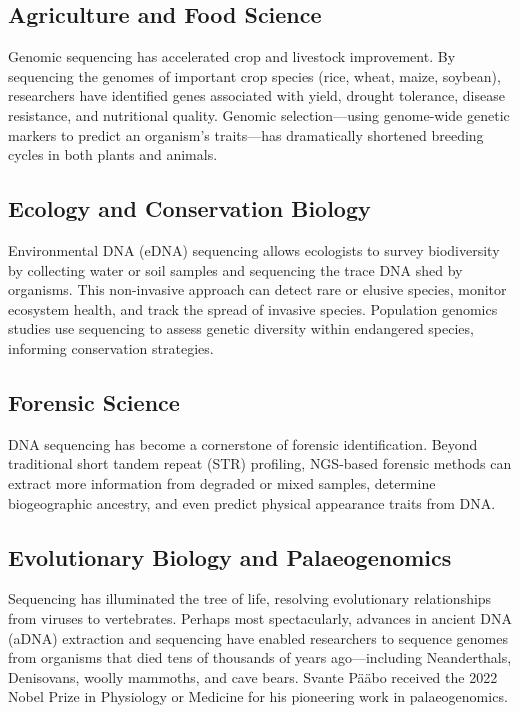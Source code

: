 \subsection{Agriculture and Food Science}
\label{subsec:intro:agriculture}

Genomic sequencing has accelerated crop and livestock improvement. By sequencing the genomes of important crop species (rice, wheat, maize, soybean), researchers have identified genes associated with yield, drought tolerance, disease resistance, and nutritional quality. Genomic selection---using genome-wide genetic markers to predict an organism's traits---has dramatically shortened breeding cycles in both plants and animals.

\subsection{Ecology and Conservation Biology}
\label{subsec:intro:ecology}

Environmental DNA (eDNA) sequencing allows ecologists to survey biodiversity by collecting water or soil samples and sequencing the trace DNA shed by organisms. This non-invasive approach can detect rare or elusive species, monitor ecosystem health, and track the spread of invasive species. Population genomics studies use sequencing to assess genetic diversity within endangered species, informing conservation strategies.

\subsection{Forensic Science}
\label{subsec:intro:forensics}

DNA sequencing has become a cornerstone of forensic identification. Beyond traditional short tandem repeat (STR) profiling, \acrshort{NGS}-based forensic methods can extract more information from degraded or mixed samples, determine biogeographic ancestry, and even predict physical appearance traits from DNA.

\subsection{Evolutionary Biology and Palaeogenomics}
\label{subsec:intro:evolution}

Sequencing has illuminated the tree of life, resolving evolutionary relationships from viruses to vertebrates. Perhaps most spectacularly, advances in ancient DNA (aDNA) extraction and sequencing have enabled researchers to sequence genomes from organisms that died tens of thousands of years ago---including Neanderthals, Denisovans, woolly mammoths, and cave bears. Svante P\"a\"abo received the 2022 Nobel Prize in Physiology or Medicine for his pioneering work in palaeogenomics.


